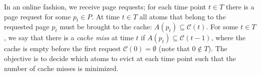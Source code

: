 \documentclass[11pt]{article}
\newcommand{\cC}{{\mathcal{C}}}
\begin{document}
{In an online fashion, we receive page requests; for each time point $t \in T$ there is a page request for some $p_t \in P$. At time $t \in T$ all atoms that belong to the requested page $p_t$ must be brought to the cache: $A(p_t) \subseteq \cC(t)$. For some $t \in T$, we say that there is a {\em cache miss} at time $t$ if $A(p_t) \subseteq \cC(t-1)$, where the cache is empty before the first request $\cC(0) = \emptyset$ (note that $0 \notin T$). The objective is to decide which atoms to evict at each time point such that the number of cache misses is minimized. 



%



}
\end{document}

